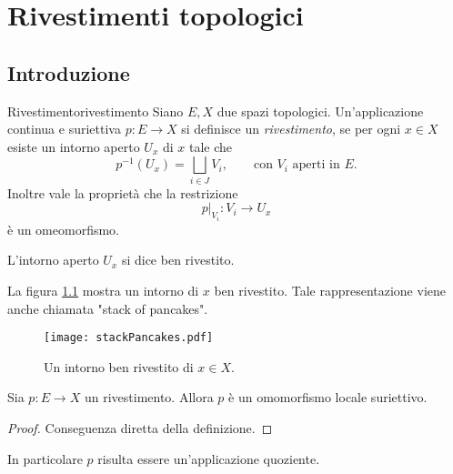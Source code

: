 \chapter{Rivestimenti topologici}
%
%
\section{Introduzione}

\begin{defn}{Rivestimento}{rivestimento}
	Siano \(E,X\) due spazi topologici.
	Un'applicazione continua e suriettiva \(p\colon E \to X\) si definisce un \emph{rivestimento}, se per ogni \(x\in X\) esiste un intorno aperto \(U_x\) di \(x\) tale che
	\[
		p^{-1}(U_x) = \bigsqcup_{i\in J} V_i, \qquad\text{con \(V_i\) aperti in \(E\)}.
	\]
	Inoltre vale la proprietà che la restrizione
	\[
		p|_{V_i}\colon V_i \to U_x
	\]
	è un omeomorfismo.
\end{defn}

\begin{notz}
	L'intorno aperto \(U_x\) si dice ben rivestito.
\end{notz}

\begin{oss}
	La figura \ref{fig:stackPancakes} mostra un intorno di \(x\) ben rivestito.
	Tale rappresentazione viene anche chiamata "stack of pancakes".
\end{oss}

\begin{figure}[tp]
	\begin{centering}
		\texttt{[image: stackPancakes.pdf]}
		\caption{Un intorno ben rivestito di \(x\in X\).}
		\label{fig:stackPancakes}
	\end{centering}
\end{figure}

\begin{lem}
	Sia \(p\colon E \to X\) un rivestimento.
	Allora \(p\) è un omomorfismo locale suriettivo.
\end{lem}

\begin{proof}
	Conseguenza diretta della definizione.
\end{proof}

\begin{oss}
	In particolare \(p\) risulta essere un'applicazione quoziente.
\end{oss}

